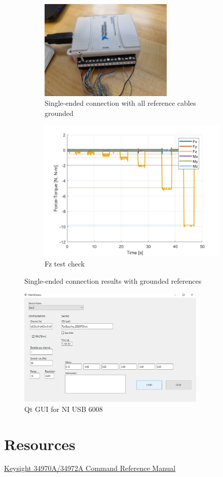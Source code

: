 \documentclass[a4paper]{article}
\begin{document}
\begin{figure}[h!]
	\begin{subfigure}{.5\textwidth}
		\centering
		\includegraphics[width=0.7\textwidth,angle=180]{NIUSB6008_ATIMini40Connection_grounded.jpg}
		\caption{Single-ended connection with all reference cables grounded}
		\label{fig:NIUSB6008_ATIMini40Connection}
	\end{subfigure}%
	\begin{subfigure}{.5\textwidth}
		\centering
		\includegraphics[width=.8\linewidth]{Forces_check50Hz_grounded.png}
		\caption{Fz test check}
		\label{fig:Forces_check50Hz_grounded}
	\end{subfigure}
	\caption{Single-ended connection results with grounded references}
	\label{fig:test2}
\end{figure}

\begin{figure}[h!]
	\centering
	\includegraphics[width=0.8\textwidth]{NIUSB6008_GUI.png}
	\caption{Qt GUI for NI USB 6008}
	\label{fig:NIUSB6008_GUI}
\end{figure}

\section{Resources}

\href{https://documentation.help/Keysight-34970A-34972A/documentation.pdf}{Keysight 34970A/34972A Command Reference Manual}



\end{document}

